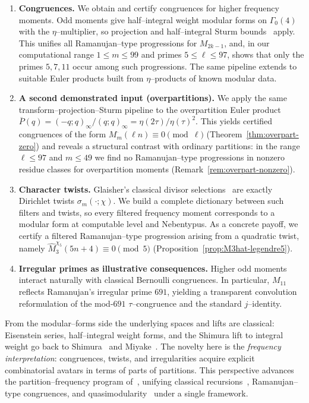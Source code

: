 \documentclass[11pt]{article}
\theoremstyle{definition}
\theoremstyle{remark}
\begin{document}
\begin{enumerate}
  \item \textbf{Congruences.} We obtain and certify congruences for higher
  frequency moments. Odd moments give half--integral weight modular forms on
  $\Gamma_0(4)$ with the $\eta$--multiplier, so projection and
  half--integral Sturm bounds~\cite{Kohnen1980,Sturm1987} apply.
  This unifies all Ramanujan--type progressions for $M_{2k-1}$, and,
  in our computational range $1\le m\le99$ and primes $5\le\ell\le97$,
  shows that only the primes $5,7,11$ occur among such progressions.
  The same pipeline extends to suitable Euler products built from
  $\eta$--products of known modular data.
    \item \textbf{A second demonstrated input (overpartitions).}
  We apply the same transform--projection--Sturm pipeline to the overpartition
  Euler product $\overline{P}(q)=(-q;q)_\infty/(q;q)_\infty=\eta(2\tau)/\eta(\tau)^2$.
  This yields certified congruences of the form
  $M_m^{\overline{\ }}(\ell n)\equiv 0\pmod{\ell}$ (Theorem~\ref{thm:overpart-zero})
  and reveals a structural contrast with ordinary partitions: in the range
  $\ell\le 97$ and $m\le 49$ we find no Ramanujan--type progressions in nonzero
  residue classes for overpartition moments (Remark~\ref{rem:overpart-nonzero}).
 \item \textbf{Character twists.} Glaisher’s classical divisor
  selections~\cite{Glaisher1885,Glaisher1891,Andrews76} are exactly
  Dirichlet twists $\sigma_m(\cdot;\chi)$. We build a complete dictionary
  between such filters and twists, so every filtered frequency moment
  corresponds to a modular form at computable level and Nebentypus. As a 
  concrete payoff, we certify a filtered Ramanujan--type progression arising 
  from a quadratic twist, namely $\widehat{M}^{\chi_5}_3(5n+4)\equiv 0\pmod{5}$ (Proposition~\ref{prop:M3hat-legendre5}).

    \item \textbf{Irregular primes as illustrative consequences.} Higher odd       moments interact naturally with classical Bernoulli congruences.  In particular,   $M_{11}$ reflects Ramanujan’s irregular prime $691$, yielding a transparent       convolution reformulation of the mod-$691$ $\tau$--congruence and the standard   $j$--identity.

\end{enumerate}

From the modular--forms side the underlying spaces and lifts are classical:
Eisenstein series, half--integral weight forms, and the Shimura lift
to integral weight go back to Shimura~\cite{Shimura1973} and
Miyake~\cite{Miyake2006}. The novelty here is the \emph{frequency
interpretation}: congruences, twists, and irregularities acquire explicit
combinatorial avatars in terms of parts of partitions. This perspective
advances the partition--frequency program of~\cite{BB21}, unifying
classical recursions~\cite{Ram16,Ford31}, Ramanujan--type congruences,
and quasimodularity~\cite{KanekoZagier1995} under a single framework.
\end{document}
